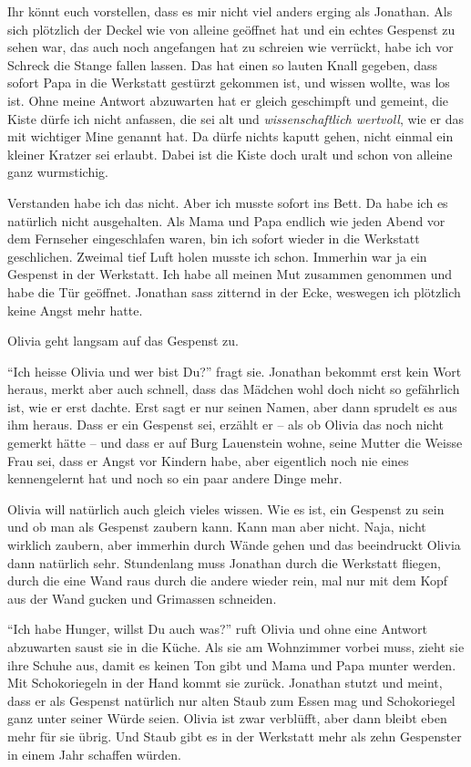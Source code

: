 \begin{mdframed}[style=mystyle]
  Ihr könnt euch vorstellen, dass es mir nicht viel anders erging als Jonathan. Als sich plötzlich der Deckel wie von alleine geöffnet hat und ein echtes Gespenst zu sehen war, das auch noch angefangen hat zu schreien wie verrückt, habe ich vor Schreck die Stange fallen lassen. Das hat einen so lauten Knall gegeben, dass sofort Papa in die Werkstatt gestürzt gekommen ist, und wissen wollte, was los ist. Ohne meine Antwort abzuwarten hat er gleich geschimpft und gemeint, die Kiste dürfe ich nicht anfassen, die sei alt und \emph{wissenschaftlich wertvoll}, wie er das mit wichtiger Mine genannt hat. Da dürfe nichts kaputt gehen, nicht einmal ein kleiner Kratzer sei erlaubt. Dabei ist die Kiste doch uralt und schon von alleine ganz wurmstichig. 
  
Verstanden habe ich das nicht. Aber ich musste sofort ins Bett. Da habe ich es natürlich nicht ausgehalten. Als Mama und Papa endlich wie jeden Abend vor dem Fernseher eingeschlafen waren, bin ich sofort wieder in die Werkstatt geschlichen. Zweimal tief Luft holen musste ich schon. Immerhin war ja ein Gespenst in der Werkstatt. Ich habe all meinen Mut zusammen genommen und habe die Tür geöffnet. Jonathan sass zitternd in der Ecke, weswegen ich plötzlich keine Angst mehr hatte. 
\end{mdframed}

Olivia geht langsam auf das Gespenst zu. 

\enquote{Ich heisse Olivia und wer bist Du?} fragt sie. Jonathan bekommt erst kein Wort heraus, merkt aber auch schnell, dass das Mädchen wohl doch nicht so gefährlich ist, wie er erst dachte. Erst sagt er nur seinen Namen, aber dann sprudelt es aus ihm heraus. Dass er ein Gespenst sei, erzählt er -- als ob Olivia das noch nicht gemerkt hätte -- und dass er auf Burg Lauenstein wohne, seine Mutter die Weisse Frau sei, dass er Angst vor Kindern habe, aber eigentlich noch nie eines kennengelernt hat und noch so ein paar andere Dinge mehr. 

Olivia will natürlich auch gleich vieles wissen. Wie es ist, ein Gespenst zu sein und ob man als Gespenst zaubern kann. Kann man aber nicht. Naja, nicht wirklich zaubern, aber immerhin durch Wände gehen und das beeindruckt Olivia dann natürlich sehr. Stundenlang muss Jonathan durch die Werkstatt fliegen, durch die eine Wand raus durch die andere wieder rein, mal nur mit dem Kopf aus der Wand gucken und Grimassen schneiden. 

\enquote{Ich habe Hunger, willst Du auch was?} ruft Olivia und ohne eine Antwort abzuwarten saust sie in die Küche. Als sie am Wohnzimmer vorbei muss, zieht sie ihre Schuhe aus, damit es keinen Ton gibt und Mama und Papa munter werden. Mit Schokoriegeln in der Hand kommt sie zurück. Jonathan stutzt und meint, dass er als Gespenst natürlich nur alten Staub zum Essen mag und Schokoriegel ganz unter seiner Würde seien. Olivia ist zwar verblüfft, aber dann bleibt eben mehr für sie übrig. Und Staub gibt es in der Werkstatt mehr als zehn Gespenster in einem Jahr schaffen würden.

